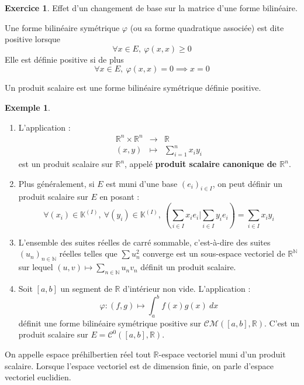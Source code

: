 \documentclass[french]{article}
\newcommand{\N}{\mathbb{N}}
\newcommand{\R}{\mathbb{R}}
\newcommand{\K}{\mathbb{K}}
\theoremstyle{plain}
\theoremstyle{definition}
\newtheorem*{ex}{Exemple}
\newtheorem{exo}{Exercice}
\theoremstyle{remark}
\begin{document}
\begin{exo}
	Effet d'un changement de base sur la matrice d'une forme bilinéaire.
\end{exo}

\begin{dfn}
	Une forme bilinéaire symétrique $\varphi$ (ou sa forme quadratique associée) est dite positive lorsque $$\forall x\in E,\ \varphi(x,x)\geqslant 0$$ Elle est définie positive si de plus $$\forall x\in E,\ \varphi(x,x)=0\implies x=0$$
\end{dfn}

\begin{dfn}
	Un produit scalaire est une forme bilinéaire symétrique définie positive.
\end{dfn}

\begin{ex}
	\begin{enumerate}
		\item L'application : $$\begin{array}{rcl}
			\R^n\times\R^n&\longrightarrow&\R \\
			(x,y)&\longmapsto&\sum_{i=1}^{n}x_iy_i
		\end{array}$$ est un produit scalaire sur $\R^n$, appelé \textbf{produit scalaire canonique de $\R^n$}.
		\item Plus généralement, si $E$ est muni d'une base $(e_i)_{i\in I}$, on peut définir un produit scalaire sur $E$ en posant : $$\forall (x_i)\in\K^{(I)},\ \forall (y_i)\in\K^{(I)},\ \left(\sum_{i\in I}x_ie_i\bigg| \sum_{i\in I} y_ie_i\right)=\sum_{i\in I}x_iy_i$$
		\item L'ensemble des suites réelles de carré sommable, c'est-à-dire des suites $(u_n)_{n\in\N}$ réelles telles que $\sum u_n^2$ converge est un sous-espace vectoriel de $\R^\N$ sur lequel $(u,v)\mapsto\displaystyle\sum_{n\in\N}u_nv_n$ définit un produit scalaire.
		\item Soit $[a,b]$ un segment de $\R$ d'intérieur non vide. L'application : $$\varphi:(f,g)\mapsto\int_{a}^{b}f(x)g(x)\ dx$$ définit une forme bilinéaire symétrique positive sur $\mathcal{CM}([a,b],\R)$. C'est un produit scalaire sur $E=\mathcal{C}^0([a,b],\R)$.
	\end{enumerate}
\end{ex}

\begin{dfn}
	On appelle espace préhilbertien réel tout $\R$-espace vectoriel muni d'un produit scalaire. Lorsque l'espace vectoriel est de dimension finie, on parle d'espace vectoriel euclidien.
\end{dfn}
\end{document}

